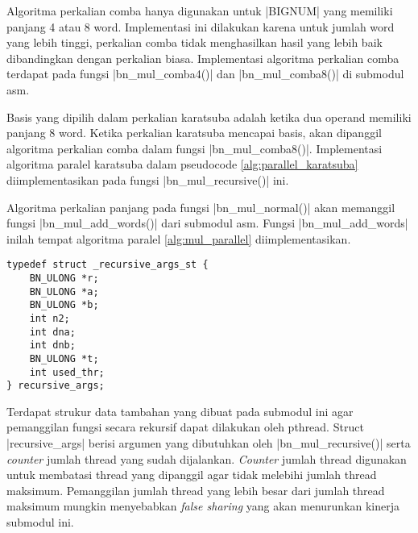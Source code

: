   Algoritma perkalian comba hanya digunakan untuk |BIGNUM| yang memiliki panjang 4 atau 8 word. Implementasi ini dilakukan karena untuk jumlah word yang lebih tinggi, perkalian comba tidak menghasilkan hasil yang lebih baik dibandingkan dengan perkalian biasa. Implementasi algoritma perkalian comba terdapat pada fungsi |bn_mul_comba4()| dan |bn_mul_comba8()| di submodul asm.

  Basis yang dipilih dalam perkalian karatsuba adalah ketika dua operand memiliki panjang 8 word. Ketika perkalian karatsuba mencapai basis, akan dipanggil algoritma perkalian comba dalam fungsi |bn_mul_comba8()|. Implementasi algoritma paralel karatsuba dalam pseudocode \ref{alg:parallel_karatsuba} diimplementasikan pada fungsi |bn_mul_recursive()| ini.

  Algoritma perkalian panjang pada fungsi |bn_mul_normal()| akan memanggil fungsi |bn_mul_add_words()| dari submodul asm. Fungsi |bn_mul_add_words| inilah tempat algoritma paralel \ref{alg:mul_parallel} diimplementasikan.

  \begin{lstlisting}[caption={Struktur Data recursive\_args}, label={code:par_st}]
typedef struct _recursive_args_st {
    BN_ULONG *r;
    BN_ULONG *a;
    BN_ULONG *b;
    int n2;
    int dna;
    int dnb;
    BN_ULONG *t;
    int used_thr;
} recursive_args;
  \end{lstlisting}

  Terdapat strukur data tambahan yang dibuat pada submodul ini agar pemanggilan fungsi secara rekursif dapat dilakukan oleh pthread. Struct |recursive_args| berisi argumen yang dibutuhkan oleh |bn_mul_recursive()| serta \textit{counter} jumlah thread yang sudah dijalankan. \textit{Counter} jumlah thread digunakan untuk membatasi thread yang dipanggil agar tidak melebihi jumlah thread maksimum. Pemanggilan jumlah thread yang lebih besar dari jumlah thread maksimum mungkin menyebabkan \textit{false sharing} yang akan menurunkan kinerja submodul ini.
